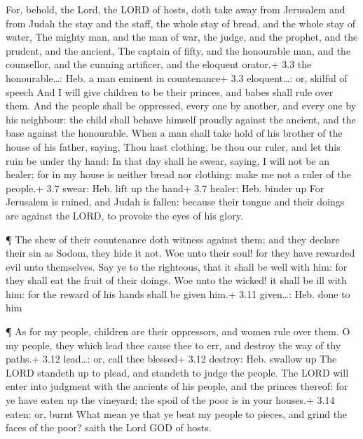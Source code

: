  For, behold, the Lord, the LORD of hosts, doth take away
from Jerusalem and from Judah the stay and the staff, the whole stay of
bread, and the whole stay of water,  The mighty man, and the
man of war, the judge, and the prophet, and the prudent, and the
ancient,  The captain of fifty, and the honourable man, and
the counsellor, and the cunning artificer, and the eloquent orator.+ 3.3
the honourable\ldots: Heb. a man eminent in countenance+ 3.3
eloquent\ldots: or, skilful of speech  And I will give
children to be their princes, and babes shall rule over them.
 And the people shall be oppressed, every one by another,
and every one by his neighbour: the child shall behave himself proudly
against the ancient, and the base against the honourable. 
When a man shall take hold of his brother of the house of his father,
saying, Thou hast clothing, be thou our ruler, and let this ruin be
under thy hand:  In that day shall he swear, saying, I will
not be an healer; for in my house is neither bread nor clothing: make me
not a ruler of the people.+ 3.7 swear: Heb. lift up the hand+ 3.7
healer: Heb. binder up  For Jerusalem is ruined, and Judah
is fallen: because their tongue and their doings are against the LORD,
to provoke the eyes of his glory.

 ¶ The shew of their countenance doth witness against them;
and they declare their sin as Sodom, they hide it not. Woe unto their
soul! for they have rewarded evil unto themselves.  Say ye
to the righteous, that it shall be well with him: for they shall eat the
fruit of their doings.  Woe unto the wicked! it shall be
ill with him: for the reward of his hands shall be given him.+ 3.11
given\ldots: Heb. done to him

 ¶ As for my people, children are their oppressors, and
women rule over them. O my people, they which lead thee cause thee to
err, and destroy the way of thy paths.+ 3.12 lead\ldots: or, call thee
blessed+ 3.12 destroy: Heb. swallow up  The LORD standeth
up to plead, and standeth to judge the people.  The LORD
will enter into judgment with the ancients of his people, and the
princes thereof: for ye have eaten up the vineyard; the spoil of the
poor is in your houses.+ 3.14 eaten: or, burnt  What mean
ye that ye beat my people to pieces, and grind the faces of the poor?
saith the Lord GOD of hosts.

